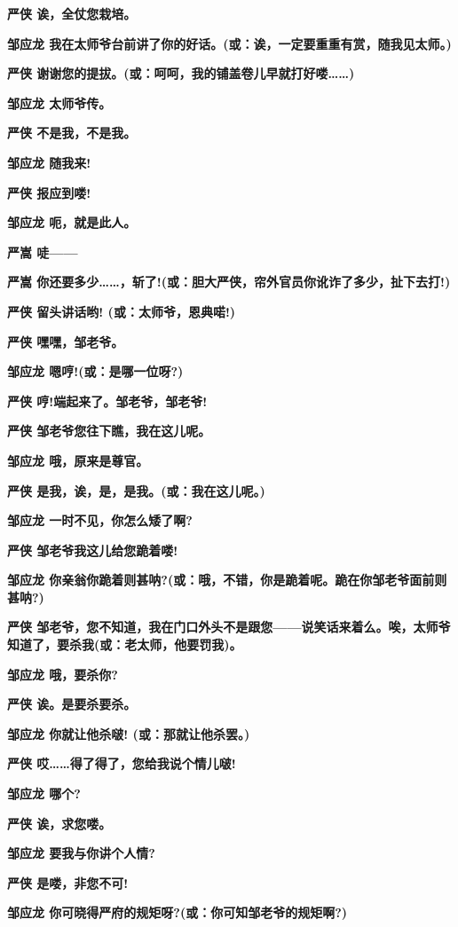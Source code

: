 \textbf{严侠 诶，全仗您栽培。}

\textbf{邹应龙
我在太师爷台前讲了你的好话。(或：诶，一定要重重有赏，随我见太师。)}

\textbf{严侠
谢谢您的提拔。(或：呵呵，我的铺盖卷儿早就打好喽\ldots{}\ldots{})}

\textbf{邹应龙 太师爷传。}

\textbf{严侠 不是我，不是我。}

\textbf{邹应龙 随我来!}

\textbf{严侠 报应到喽!}

\textbf{邹应龙 呃，就是此人。}

\textbf{严嵩 唗------}

\textbf{严嵩
你还要多少\ldots{}\ldots{}，斩了!(或：胆大严侠，帘外官员你讹诈了多少，扯下去打!)}

\textbf{严侠 留头讲话哟! (或：太师爷，恩典喏!)}

\textbf{严侠 嘿嘿，邹老爷。}

\textbf{邹应龙 嗯哼!(或：是哪一位呀?)}

\textbf{严侠 哼!端起来了。邹老爷，邹老爷!}

\textbf{严侠 邹老爷您往下瞧，我在这儿呢。}

\textbf{邹应龙 哦，原来是尊官。}

\textbf{严侠 是我，诶，是，是我。(或：我在这儿呢。)}

\textbf{邹应龙 一时不见，你怎么矮了啊?}

\textbf{严侠 邹老爷我这儿给您跪着喽!}

\textbf{邹应龙
你亲翁你跪着则甚呐?(或：哦，不错，你是跪着呢。跪在你邹老爷面前则甚呐?)}

\textbf{严侠
邹老爷，您不知道，我在门口外头不是跟您------说笑话来着么。唉，太师爷知道了，要杀我(或：老太师，他要罚我)。}

\textbf{邹应龙 哦，要杀你?}

\textbf{严侠 诶。是要杀要杀。}

\textbf{邹应龙 你就让他杀啵! (或：那就让他杀罢。)}

\textbf{严侠 哎\ldots{}\ldots{}得了得了，您给我说个情儿啵!}

\textbf{邹应龙 哪个?}

\textbf{严侠 诶，求您喽。}

\textbf{邹应龙 要我与你讲个人情?}

\textbf{严侠 是喽，非您不可!}

\textbf{邹应龙 你可晓得严府的规矩呀?(或：你可知邹老爷的规矩啊?)}

